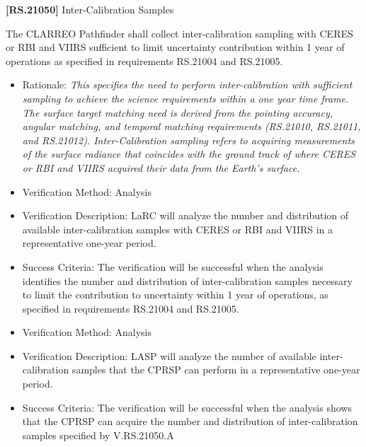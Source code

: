 \documentclass[12pt,oneside,oldfontcommands]{memoir}
\begin{document}
\textbf{[RS.21050]} Inter-Calibration Samples

The \gls{CLARREO} Pathfinder shall \gls{collect} inter-calibration sampling with \gls{CERES} or \gls{RBI} and \gls{VIIRS} sufficient to limit uncertainty contribution within 1 year of operations as specified in requirements \gls{RS}.21004 and \gls{RS}.21005.

\begin{itemize}
\item{} Rationale: \emph{This specifies the need to perform inter-calibration with sufficient sampling to achieve the science requirements within a one year time frame. The surface target matching need is derived from the pointing accuracy, angular matching, and temporal matching requirements (RS.21010, RS.21011, and RS.21012). Inter-Calibration sampling refers to acquiring measurements of the surface radiance that coincides with the ground track of where CERES or RBI and VIIRS acquired their data from the Earth's surface.}

\item{} Verification Method: Analysis

\item{} Verification Description: \gls{LaRC} will analyze the number and distribution of available inter-calibration \gls{sample}s with \gls{CERES} or \gls{RBI} and \gls{VIIRS} in a representative one-year period.

\item{} Success Criteria: The verification will be successful when the \gls{analysis} identifies the number and distribution of inter-calibration \gls{sample}s necessary to limit the contribution to uncertainty within 1 year of operations, as specified in requirements \gls{RS}.21004 and \gls{RS}.21005.

\item{} Verification Method: Analysis

\item{} Verification Description: \gls{LASP} will analyze the number of available inter-calibration \gls{sample}s that the \gls{CPRSP} can perform in a representative one-year period.

\item{} Success Criteria: The verification will be successful when the \gls{analysis} shows that the \gls{CPRSP} can acquire the number and distribution of inter-calibration \gls{sample}s specified by V.\gls{RS}.21050.A

\end{itemize}
\end{document}
